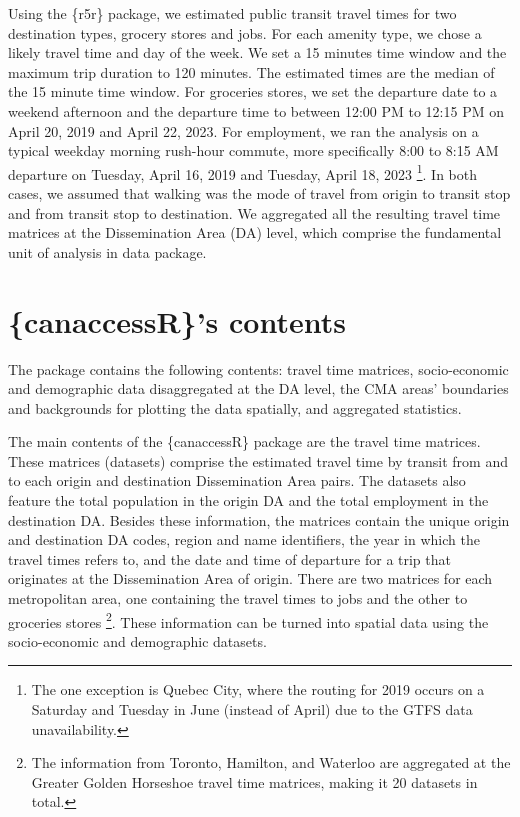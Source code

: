 \documentclass[Royal,times,sageh]{sagej}
\begin{document}
Using the \{r5r\} package, we estimated public transit travel times for
two destination types, grocery stores and jobs. For each amenity type,
we chose a likely travel time and day of the week. We set a 15 minutes
time window and the maximum trip duration to 120 minutes. The estimated
times are the median of the 15 minute time window. For groceries stores,
we set the departure date to a weekend afternoon and the departure time
to between 12:00 PM to 12:15 PM on April 20, 2019 and April 22, 2023.
For employment, we ran the analysis on a typical weekday morning
rush-hour commute, more specifically 8:00 to 8:15 AM departure on
Tuesday, April 16, 2019 and Tuesday, April 18, 2023 \footnote{The one
  exception is Quebec City, where the routing for 2019 occurs on a
  Saturday and Tuesday in June (instead of April) due to the GTFS data
  unavailability.}. In both cases, we assumed that walking was the mode
of travel from origin to transit stop and from transit stop to
destination. We aggregated all the resulting travel time matrices at the
Dissemination Area (DA) level, which comprise the fundamental unit of
analysis in data package.

\section{\{canaccessR\}'s contents}\label{canaccessrs-contents}

The package contains the following contents: travel time matrices,
socio-economic and demographic data disaggregated at the DA level, the
CMA areas' boundaries and backgrounds for plotting the data spatially,
and aggregated statistics.

The main contents of the \{canaccessR\} package are the travel time
matrices. These matrices (datasets) comprise the estimated travel time
by transit from and to each origin and destination Dissemination Area
pairs. The datasets also feature the total population in the origin DA
and the total employment in the destination DA. Besides these
information, the matrices contain the unique origin and destination DA
codes, region and name identifiers, the year in which the travel times
refers to, and the date and time of departure for a trip that originates
at the Dissemination Area of origin. There are two matrices for each
metropolitan area, one containing the travel times to jobs and the other
to groceries stores \footnote{The information from Toronto, Hamilton,
  and Waterloo are aggregated at the Greater Golden Horseshoe travel
  time matrices, making it 20 datasets in total.}. These information can
be turned into spatial data using the socio-economic and demographic
datasets.
\end{document}
